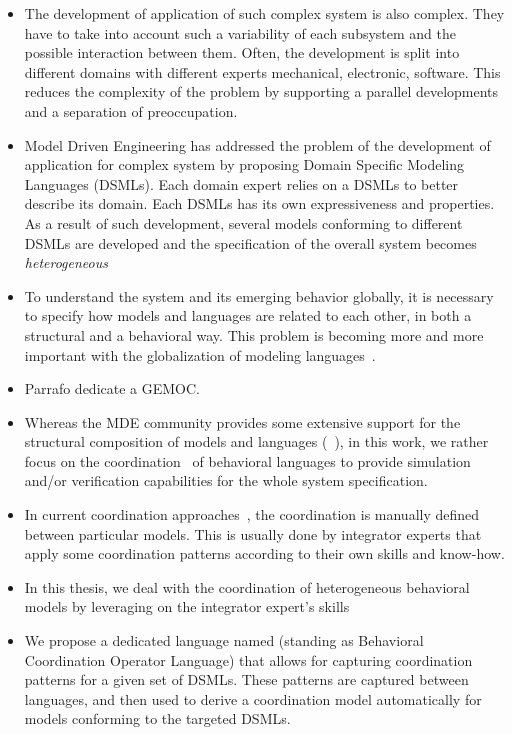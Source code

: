 \begin{itemize}
	\item The development of application of such complex system is also complex. They have to take into account such a variability of each subsystem and the possible interaction between them. Often, the development is split into different domains with different experts \eg mechanical, electronic, software. This reduces the complexity of the problem by supporting a parallel developments and a separation of preoccupation. 
	
	\item Model Driven Engineering has addressed the problem of the development of application for complex system by proposing Domain Specific Modeling Languages (DSMLs). Each domain expert relies on a DSMLs to better describe its domain. Each DSMLs has its own expressiveness and properties. As a result of such development, several models conforming to different DSMLs are developed and the specification of the overall system becomes \emph{heterogeneous}

	\item To understand the system and its emerging behavior globally, it is necessary to specify how models and languages are related to each other, in both a structural and a behavioral way. This problem is becoming more and more important with the globalization of modeling languages~\cite{gemoccolum}.
	
	\item Parrafo dedicate a GEMOC.
	
	\item Whereas the MDE community provides some extensive support for the structural composition of models and languages (\eg~\cite{kompose,epsilon}), in this work, we rather focus on the coordination~\cite{coordlangandsigni} of behavioral languages to provide simulation and/or verification capabilities for the whole system specification. 
	
	\item In current coordination approaches~\cite{coordlangandsigni,rapide,esperbib,varalarsen:gemoc13}, the coordination is manually defined between particular models. This is usually done by integrator experts that apply some coordination patterns according to their own skills and know-how.
	
	
	 \item In this thesis, we deal with the coordination of heterogeneous behavioral models by leveraging on the integrator expert's skills 
	 
	 \item We propose a dedicated language named \bcool (standing as Behavioral Coordination Operator Language) that allows for capturing coordination patterns for a given set of DSMLs. These patterns are captured between languages, and then used to derive a coordination model automatically for models conforming to the targeted DSMLs. 
	 

\end{itemize}
